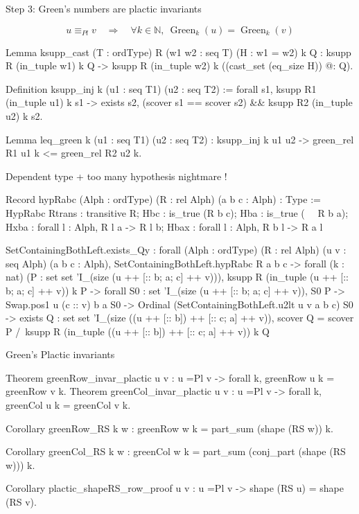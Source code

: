 \documentclass[compress,11pt]{beamer}
\newcommand{\N}{{\mathbb N}}
\begin{document}
\begin{frame}[fragile]{Step 3: Green's numbers are plactic invariants}

\[
u \equiv_{Pl} v\quad \Longrightarrow\quad
 \forall k\in\N,\ \operatorname{Green}_k(u) = \operatorname{Green}_k(v)
\]
  \begin{coqcode}
Lemma ksupp_cast (T : ordType) R (w1 w2 : seq T) (H : w1 = w2) k Q :
  ksupp R (in_tuple w1) k Q ->
  ksupp R (in_tuple w2) k ((cast_set (eq_size H)) @: Q).

Definition ksupp_inj k (u1 : seq T1) (u2 : seq T2) :=
  forall s1, ksupp R1 (in_tuple u1) k s1 ->
    exists s2, (scover s1 == scover s2) && ksupp R2 (in_tuple u2) k s2.

Lemma leq_green k (u1 : seq T1) (u2 : seq T2) :
  ksupp_inj k u1 u2 -> green_rel R1 u1 k <= green_rel R2 u2 k.
  \end{coqcode}
\end{frame}


\begin{frame}[fragile]{Dependent type + too many hypothesis nightmare !}
  \begin{coqcode}
Record hypRabc (Alph : ordType) (R : rel Alph) (a b c : Alph) : 
Type := HypRabc
  { Rtrans : transitive R;
    Hbc : is_true (R b c);
    Hba : is_true (~~ R b a);
    Hxba : forall l : Alph, R l a -> R l b;
    Hbax : forall l : Alph, R b l -> R a l }

SetContainingBothLeft.exists_Qy
     : forall (Alph : ordType) (R : rel Alph) (u v : seq Alph) (a b c : Alph),
       SetContainingBothLeft.hypRabc R a b c ->
       forall (k : nat) (P : {set {set 'I_(size (u ++ [:: b; a; c] ++ v))}}),
       ksupp R (in_tuple (u ++ [:: b; a; c] ++ v)) k P ->
       forall S0 : {set 'I_(size (u ++ [:: b; a; c] ++ v))},
       S0 \in P ->
       Swap.pos1 u (c :: v) b a \in S0 ->
       Ordinal (SetContainingBothLeft.u2lt u v a b c) \in S0 ->
       exists Q : {set {set 'I_(size ((u ++ [:: b]) ++ [:: c; a] ++ v))}},
         scover Q = scover P /\
         ksupp R (in_tuple ((u ++ [:: b]) ++ [:: c; a] ++ v)) k Q
  \end{coqcode}
\end{frame}

\begin{frame}[fragile]{Green's Plactic invariants}

  \begin{coqcode}
Theorem greenRow_invar_plactic u v :
  u =Pl v -> forall k, greenRow u k = greenRow v k.
Theorem greenCol_invar_plactic u v :
  u =Pl v -> forall k, greenCol u k = greenCol v k.

Corollary greenRow_RS k w :
  greenRow w k = part_sum (shape (RS w)) k.

Corollary greenCol_RS k w :
  greenCol w k = part_sum (conj_part (shape (RS w))) k.

Corollary plactic_shapeRS_row_proof u v :
  u =Pl v -> shape (RS u) = shape (RS v).
  \end{coqcode}
\end{frame}
\end{document}
